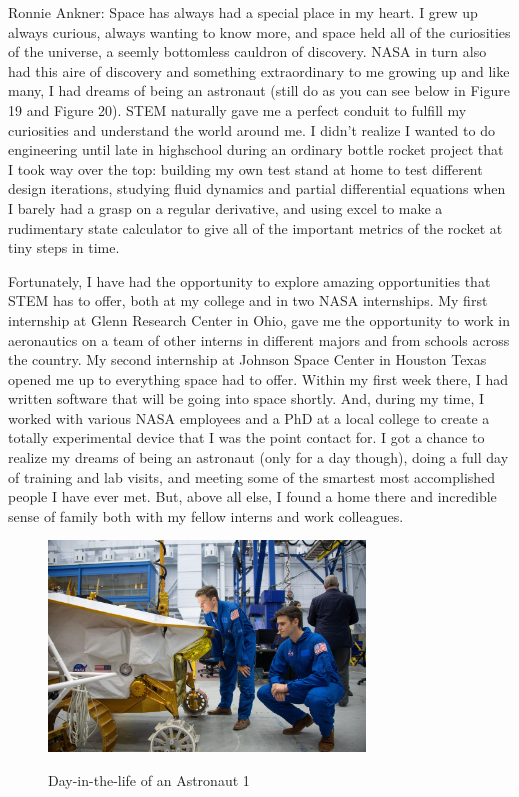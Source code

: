\documentclass{article}
\begin{document}
Ronnie Ankner: Space has always had a special place in my heart. I grew up always curious, always wanting to know more, and space held all of the curiosities of the universe, a seemly bottomless cauldron of discovery. NASA in turn also had this aire of discovery and something extraordinary to me growing up and like many, I had dreams of being an astronaut (still do as you can see below in Figure 19 and Figure 20). STEM naturally gave me a perfect conduit to fulfill my curiosities and understand the world around me. I didn’t realize I wanted to do engineering until late in highschool during an ordinary bottle rocket project that I took way over the top: building my own test stand at home to test different design iterations, studying fluid dynamics and partial differential equations when I barely had a grasp on a regular derivative, and using excel to make a rudimentary state calculator to give all of the important metrics of the rocket at tiny steps in time.

Fortunately, I have had the opportunity to explore amazing opportunities that STEM has to offer, both at my college and in two NASA internships. My first internship at Glenn Research Center in Ohio, gave me the opportunity to work in aeronautics on a team of other interns in different majors and from schools across the country. My second internship at Johnson Space Center in Houston Texas opened me up to everything space had to offer. Within my first week there, I had written software that will be going into space shortly. And, during my time, I worked with various NASA employees and a PhD at a local college to create a totally experimental device that I was the point contact for. I got a chance to realize my dreams of being an astronaut (only for a day though), doing a full day of training and lab visits, and meeting some of the smartest most accomplished people I have ever met. But, above all else, I found a home there and incredible sense of family both with my fellow interns and work colleagues.

\begin{figure}[!htb]
  \centering
  \caption{Day-in-the-life of an Astronaut 1}
  \includegraphics[width=0.75\textwidth]{assets/staringatrover.jpg}
  \label{fig:staringatrover}
\end{figure}
\end{document}
